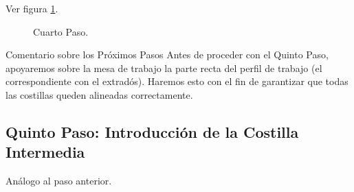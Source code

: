 Ver figura \ref{fig:cua}.

\begin{figure}[!htb]
\centering
{}
\caption{Cuarto Paso. \label{fig:cua}}
\end{figure}

\begin{nota}{Comentario sobre los Próximos Pasos}{}
    Antes de proceder con el Quinto Paso, apoyaremos sobre la mesa de trabajo la parte recta del perfil de trabajo (el correspondiente con el extradós). Haremos esto con el fin de garantizar que todas las costillas queden alineadas correctamente.
\end{nota}


\subsection{Quinto Paso: Introducción de la Costilla Intermedia}
Análogo al paso anterior.

